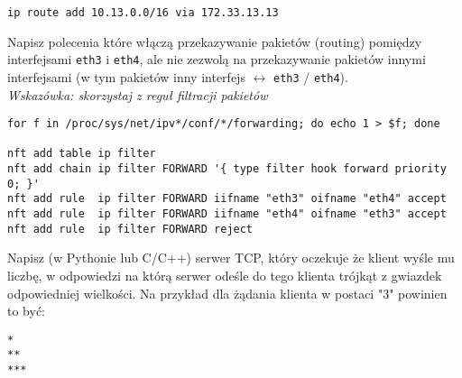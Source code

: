 \dbEntryCheckResults
\begin{Verbatim}
ip route add 10.13.0.0/16 via 172.33.13.13
\end{Verbatim}
\fi


\dbEntryCheckResults
Napisz polecenia które włączą przekazywanie pakietów (routing) pomiędzy interfejsami \Verb#eth3# i \Verb#eth4#, ale nie zezwolą na przekazywanie pakietów innymi interfejsami (w tym pakietów inny interfejs $\leftrightarrow$ \Verb#eth3# / \Verb#eth4#).
\\
\textit{Wskazówka: skorzystaj z reguł filtracji pakietów}
\fi

\dbEntryCheckResults
\begin{Verbatim}
for f in /proc/sys/net/ipv*/conf/*/forwarding; do echo 1 > $f; done

nft add table ip filter
nft add chain ip filter FORWARD '{ type filter hook forward priority 0; }'
nft add rule  ip filter FORWARD iifname "eth3" oifname "eth4" accept
nft add rule  ip filter FORWARD iifname "eth4" oifname "eth3" accept
nft add rule  ip filter FORWARD reject
\end{Verbatim}
\fi


\dbEntryCheckResults
Napisz (w Pythonie lub C/C++) serwer TCP, który oczekuje że klient wyśle mu liczbę, w odpowiedzi na którą serwer odeśle do tego klienta trójkąt z gwiazdek odpowiedniej wielkości.
Na przykład dla żądania klienta w postaci "3" powinien to być:
\begin{Verbatim}
*
**
***
\end{Verbatim}
\fi

